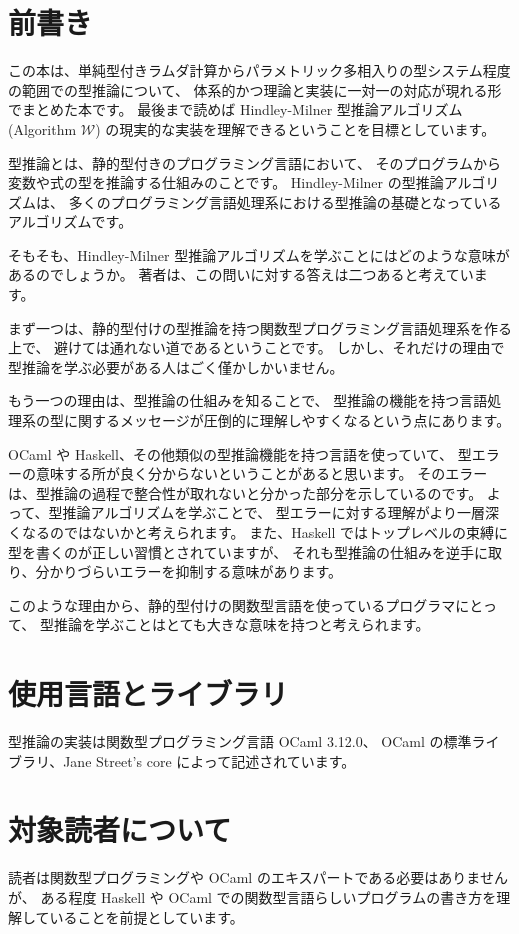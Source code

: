 
\section*{前書き}

この本は、単純型付きラムダ計算からパラメトリック多相入りの型システム程度の範囲での型推論について、
体系的かつ理論と実装に一対一の対応が現れる形でまとめた本です。
最後まで読めば Hindley-Milner 型推論アルゴリズム(Algorithm $\mathcal W$)
の現実的な実装を理解できるということを目標としています。

型推論とは、静的型付きのプログラミング言語において、
そのプログラムから変数や式の型を推論する仕組みのことです。
Hindley-Milner の型推論アルゴリズムは、
多くのプログラミング言語処理系における型推論の基礎となっているアルゴリズムです。

そもそも、Hindley-Milner 型推論アルゴリズムを学ぶことにはどのような意味があるのでしょうか。
著者は、この問いに対する答えは二つあると考えています。

まず一つは、静的型付けの型推論を持つ関数型プログラミング言語処理系を作る上で、
避けては通れない道であるということです。
しかし、それだけの理由で型推論を学ぶ必要がある人はごく僅かしかいません。

もう一つの理由は、型推論の仕組みを知ることで、
型推論の機能を持つ言語処理系の型に関するメッセージが圧倒的に理解しやすくなるという点にあります。

OCaml や Haskell、その他類似の型推論機能を持つ言語を使っていて、
型エラーの意味する所が良く分からないということがあると思います。
そのエラーは、型推論の過程で整合性が取れないと分かった部分を示しているのです。
よって、型推論アルゴリズムを学ぶことで、
型エラーに対する理解がより一層深くなるのではないかと考えられます。
また、Haskell ではトップレベルの束縛に型を書くのが正しい習慣とされていますが、
それも型推論の仕組みを逆手に取り、分かりづらいエラーを抑制する意味があります。

このような理由から、静的型付けの関数型言語を使っているプログラマにとって、
型推論を学ぶことはとても大きな意味を持つと考えられます。

\section*{使用言語とライブラリ}

型推論の実装は関数型プログラミング言語 OCaml 3.12.0、
OCaml の標準ライブラリ、Jane Street's core によって記述されています。

\section*{対象読者について}

読者は関数型プログラミングや OCaml のエキスパートである必要はありませんが、
ある程度 Haskell や OCaml での関数型言語らしいプログラムの書き方を理解していることを前提としています。

